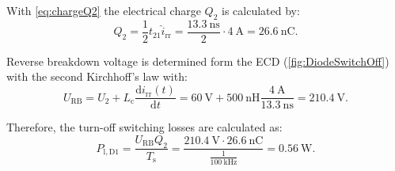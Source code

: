 \begin{solutionblock}
    With \eqref{eq:chargeQ2} the electrical charge $Q_2$ is calculated by:
    \begin{equation}
        Q_2 = \frac{1}{2} t_{21} \hat{i}_{\mathrm{rr}} = \frac{\SI{13.3}{\nano\second}}{2} \cdot \SI{4}{\ampere} = \SI{26.6}{\nano\coulomb}.
    \end{equation}

    Reverse breakdown voltage is determined form the ECD (\autoref{fig:DiodeSwitchOff}) with the second Kirchhoff's law with:
    \begin{equation}
        U_{\mathrm{RB}} = U_2 + L_{\mathrm{c}} \frac{\mathrm{d}i_{\mathrm{rr}}(t)}{\mathrm{d}t} = \SI{60}{\volt} + \SI{500}{\nano\henry} \frac{\SI{4}{\ampere}}{\SI{13.3}{\nano\second}} = \SI{210.4}{\volt}.
        \label{eq:reverseBreakdownVoltage}
    \end{equation}

    Therefore, the turn-off switching losses are calculated as:
    \begin{equation}
        P_{\mathrm{l,D1}} = \frac{U_{\mathrm{RB}}Q_2}{T_{\mathrm{s}}} = \frac{\SI{210.4}{\volt}\cdot \SI{26.6}{\nano\coulomb}}{\frac{1}{\SI{100}{\kilo\hertz}}} = \SI{0.56}{\watt}.
    \end{equation}

\end{solutionblock}




